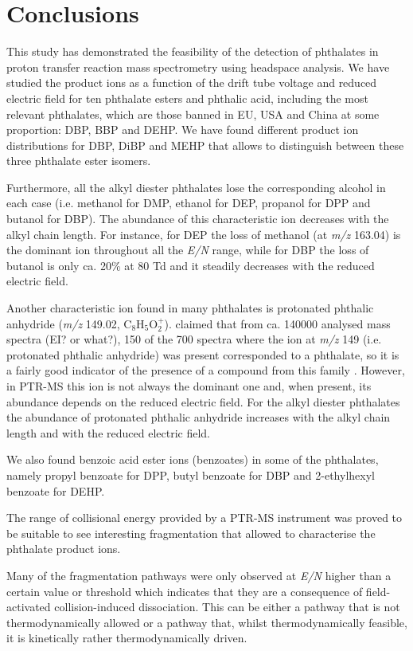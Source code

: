 \section{Conclusions}
    This study has demonstrated the feasibility of the  detection of phthalates in proton transfer reaction mass spectrometry using headspace analysis. 
We  have studied the product ions as a function of the drift tube voltage and reduced electric field for ten phthalate esters and phthalic acid, including the most relevant phthalates, which are those banned in EU, USA and China at some proportion: DBP, BBP and DEHP.
    We have found different product ion distributions for  DBP, DiBP and MEHP that allows to distinguish between these three phthalate ester isomers.
    
Furthermore, all the alkyl diester phthalates lose  the corresponding alcohol in each case (i.e. methanol for DMP, ethanol for DEP, propanol for DPP and butanol for DBP). The abundance of this characteristic ion decreases with  the alkyl chain length. For instance, for DEP the loss of methanol (at \textit{m/z} 163.04) is the dominant ion throughout all the \textit{E/N} range, while for DBP the loss of butanol is only ca. 20\% at 80 Td and it steadily decreases with the reduced electric field. 

Another characteristic ion found in many phthalates is protonated phthalic anhydride (\textit{m/z} 149.02, C$_8$H$_5$O$_2^+$). \citeauthor{mclafferty1993interpretation}  claimed that from ca. 140000 analysed mass spectra (EI? or what?),  150 of the 700 spectra where the ion at \textit{m/z} 149 (i.e. protonated phthalic anhydride) was present corresponded to a phthalate,  so it is a fairly good indicator of the presence of a compound from this family \cite{mclafferty1993interpretation}. 
%
However, in PTR-MS this ion is not always the dominant one and, when present, its abundance depends on  the reduced electric field. For the alkyl diester phthalates the abundance of protonated phthalic anhydride  increases with the alkyl chain length and with the reduced electric field.

We also found  benzoic acid ester ions (benzoates) in some of the phthalates, namely propyl benzoate for DPP, butyl benzoate for DBP and 2-ethylhexyl benzoate for DEHP.


The range of collisional energy provided by a  PTR-MS instrument was proved to be suitable to see interesting fragmentation that allowed to characterise the phthalate product ions.

Many of the fragmentation pathways were only observed at \textit{E/N} higher than a certain value or threshold which indicates that they are a consequence of field-activated collision-induced dissociation.
%
This can be either a pathway that is not thermodynamically allowed or a pathway that, whilst thermodynamically feasible, it is kinetically rather thermodynamically driven.





